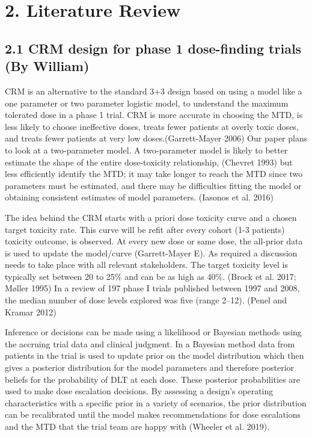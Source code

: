 \documentclass[
]{article}
\begin{document}
\newpage

\hypertarget{literature-review}{%
\section{2. Literature Review}\label{literature-review}}

\hypertarget{crm-design-for-phase-1-dose-finding-trials-by-william}{%
\subsection{2.1 CRM design for phase 1 dose-finding trials (By
William)}\label{crm-design-for-phase-1-dose-finding-trials-by-william}}

CRM is an alternative to the standard 3+3 design based on using a model
like a one parameter or two parameter logistic model, to understand the
maximum tolerated dose in a phase 1 trial. CRM is more accurate in
choosing the MTD, is less likely to choose ineffective doses, treats
fewer patients at overly toxic doses, and treats fewer patients at very
low doses.(Garrett-Mayer 2006) Our paper plans to look at a
two-parameter model. A two-parameter model is likely to better estimate
the shape of the entire dose-toxicity relationship, (Chevret 1993) but
less efficiently identify the MTD; it may take longer to reach the MTD
since two parameters must be estimated, and there may be difficulties
fitting the model or obtaining consistent estimates of model parameters.
(Iasonos et al. 2016)

The idea behind the CRM starts with a priori dose toxicity curve and a
chosen target toxicity rate. This curve will be refit after every cohort
(1-3 patients) toxicity outcome, is observed. At every new dose or same
dose, the all-prior data is used to update the model/curve
(Garrett-Mayer E). As required a discussion needs to take place with all
relevant stakeholders. The target toxicity level is typically set
between 20 to 25\% and can be as high as 40\%. (Brock et al. 2017;
Møller 1995) In a review of 197 phase I trials published between 1997
and 2008, the median number of dose levels explored was five (range
2--12). (Penel and Kramar 2012)

Inference or decisions can be made using a likelihood or Bayesian
methods using the accruing trial data and clinical judgment. In a
Bayesian method data from patients in the trial is used to update prior
on the model distribution which then gives a posterior distribution for
the model parameters and therefore posterior beliefs for the probability
of DLT at each dose. These posterior probabilities are used to make dose
escalation decisions. By assessing a design's operating characteristics
with a specific prior in a variety of scenarios, the prior distribution
can be recalibrated until the model makes recommendations for dose
escalations and the MTD that the trial team are happy with (Wheeler et
al. 2019).
\end{document}
